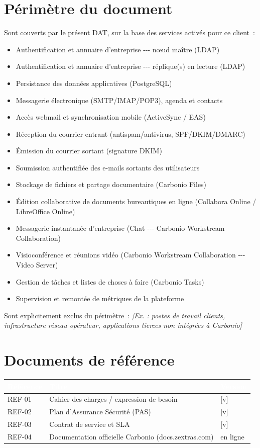 \documentclass[11pt,a4paper]{report}
\newcommand{\placeholder}[1]{\textit{\textcolor{placeholdercol}{[#1]}}\par\vspace{4pt}}
\newcommand{\tblhead}[1]{\textcolor{white}{\textbf{#1}}}
\begin{document}
\section{Périmètre du document}
Sont couverts par le présent DAT, sur la base des services activés pour ce client~:
\begin{itemize}[nosep]
  \item Authentification et annuaire d'entreprise -\allowbreak{}-\allowbreak{}-\allowbreak{} nœud maître (LDAP)
  \item Authentification et annuaire d'entreprise -\allowbreak{}-\allowbreak{}-\allowbreak{} réplique(s) en lecture (LDAP)
  \item Persistance des données applicatives (PostgreSQL)
  \item Messagerie électronique (SMTP/IMAP/POP3), agenda et contacts
  \item Accès webmail et synchronisation mobile (ActiveSync / EAS)
  \item Réception du courrier entrant (antispam/antivirus, SPF/DKIM/DMARC)
  \item Émission du courrier sortant (signature DKIM)
  \item Soumission authentifiée des e-\allowbreak{}mails sortants des utilisateurs
  \item Stockage de fichiers et partage documentaire (Carbonio Files)
  \item Édition collaborative de documents bureautiques en ligne (Collabora Online / LibreOffice Online)
  \item Messagerie instantanée d'entreprise (Chat -\allowbreak{}-\allowbreak{}-\allowbreak{} Carbonio Workstream Collaboration)
  \item Visioconférence et réunions vidéo (Carbonio Workstream Collaboration -\allowbreak{}-\allowbreak{}-\allowbreak{} Video Server)
  \item Gestion de tâches et listes de choses à faire (Carbonio Tasks)
  \item Supervision et remontée de métriques de la plateforme
\end{itemize}

Sont explicitement exclus du périmètre~:
\placeholder{Ex. : postes de travail clients, infrastructure réseau opérateur, applications tierces non intégrées à Carbonio}

\section{Documents de référence}
\begin{longtable}{|p{2cm}|p{8.5cm}|p{2.5cm}|}
\hline
\rowcolor{primary}\tblhead{Référence} & \tblhead{Titre} & \tblhead{Version} \\
\hline
\endhead
REF-01 & Cahier des charges / expression de besoin & [v] \\
\hline
REF-02 & Plan d'Assurance Sécurité (PAS) & [v] \\
\hline
REF-03 & Contrat de service et SLA & [v] \\
\hline
REF-04 & Documentation officielle Carbonio (docs.zextras.com) & en ligne \\
\hline
\end{longtable}
\end{document}
